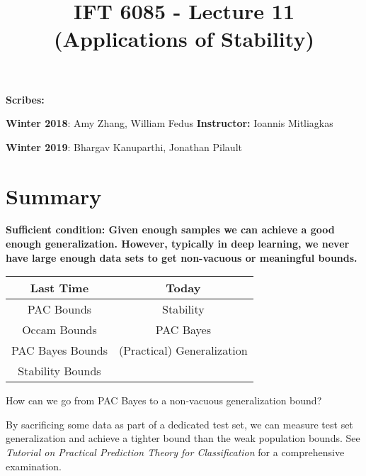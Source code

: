 \documentclass{article}
\title{IFT 6085 - Lecture 11 \\ 
(Applications of Stability) }
\date{}
\begin{document}
 

\maketitle

\textbf{Scribes:} 

\textbf{Winter 2018}: Amy Zhang, William Fedus
\hfill
\textbf{Instructor:} Ioannis Mitliagkas

\textbf{Winter 2019}: Bhargav Kanuparthi, Jonathan Pilault



\newcommand{\infgc}{\inf_{g \in \mathcal{C}}}
\newcommand{\supgc}{\sup_{g \in \mathcal{C}}}

\newcommand{\Prob}{\mathbb{P}}
\newcommand{\E}{\mathbb{E}}
\newcommand{\reals}{\mathbb{R}}

\section*{Summary}
\textbf{Sufficient condition: Given enough samples we can achieve a good enough generalization.  However, typically in deep learning, we never have large enough data sets to get non-vacuous or meaningful bounds.}

\begin{table}[h!]
\centering
\begin{tabular}{|c  | c|} 
 \hline
 \rowcolor{shadethmcolor}
 \textbf{Last Time} & \textbf{Today} \\ [0.5ex] 
 \hline
 PAC Bounds &  Stability \\
 Occam Bounds & PAC Bayes \\
 PAC Bayes Bounds & (Practical) Generalization \\
 Stability Bounds &  \\
\hline
\end{tabular}
\end{table}

How can we go from PAC Bayes to a non-vacuous generalization bound?

\vspace{0.3cm}
By sacrificing some data as part of a dedicated test set, we can measure test set generalization and achieve a tighter bound than the weak population bounds.  See \textit{Tutorial on Practical Prediction Theory for Classification} \cite{Langford:2005:TPP:1046920.1058111} for a comprehensive examination.
\end{document}

